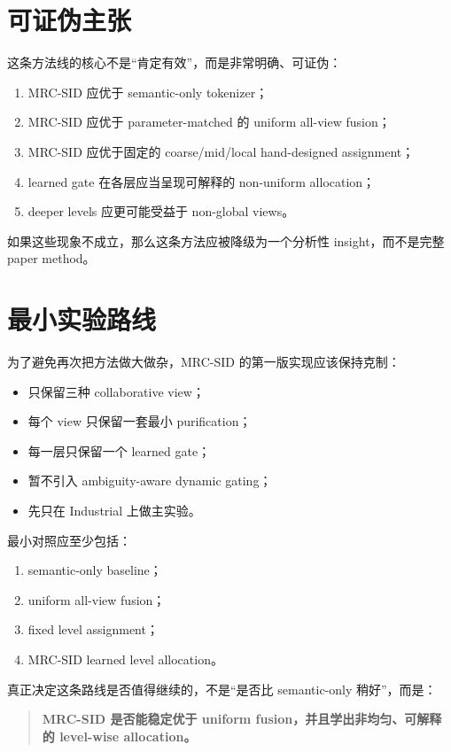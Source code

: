 \documentclass[11pt]{article}
\begin{document}
\section{可证伪主张}

这条方法线的核心不是“肯定有效”，而是非常明确、可证伪：
\begin{enumerate}
  \item MRC-SID 应优于 semantic-only tokenizer；
  \item MRC-SID 应优于 parameter-matched 的 uniform all-view fusion；
  \item MRC-SID 应优于固定的 coarse/mid/local hand-designed assignment；
  \item learned gate 在各层应当呈现可解释的 non-uniform allocation；
  \item deeper levels 应更可能受益于 non-global views。
\end{enumerate}

如果这些现象不成立，那么这条方法应被降级为一个分析性 insight，而不是完整 paper method。

\section{最小实验路线}

为了避免再次把方法做大做杂，MRC-SID 的第一版实现应该保持克制：
\begin{itemize}
  \item 只保留三种 collaborative view；
  \item 每个 view 只保留一套最小 purification；
  \item 每一层只保留一个 learned gate；
  \item 暂不引入 ambiguity-aware dynamic gating；
  \item 先只在 Industrial 上做主实验。
\end{itemize}

最小对照应至少包括：
\begin{enumerate}
  \item semantic-only baseline；
  \item uniform all-view fusion；
  \item fixed level assignment；
  \item MRC-SID learned level allocation。
\end{enumerate}

真正决定这条路线是否值得继续的，不是“是否比 semantic-only 稍好”，而是：
\begin{quote}
\textbf{MRC-SID 是否能稳定优于 uniform fusion，并且学出非均匀、可解释的 level-wise allocation。}
\end{quote}
\end{document}

